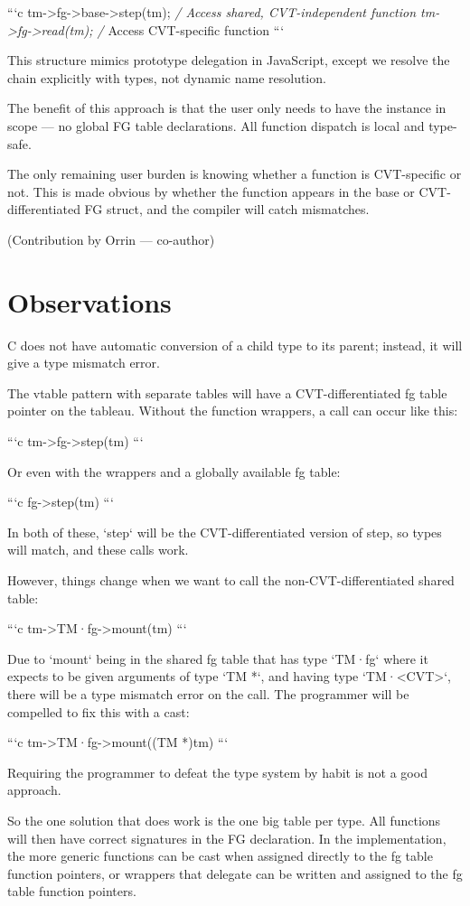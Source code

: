 \documentclass[11pt]{article}
\begin{document}
```c
tm->fg->base->step(tm); \emph{/ Access shared, CVT-independent function
tm->fg->read(tm);       /} Access CVT-specific function
```

This structure mimics prototype delegation in JavaScript, except we resolve the chain explicitly with types, not dynamic name resolution.

The benefit of this approach is that the user only needs to have the instance in scope — no global FG table declarations. All function dispatch is local and type-safe.

The only remaining user burden is knowing whether a function is CVT-specific or not. This is made obvious by whether the function appears in the base or CVT-differentiated FG struct, and the compiler will catch mismatches.

(Contribution by Orrin — co-author)

\section{Observations}
\label{sec:org46e6336}

C does not have automatic conversion of a child type to its parent; instead, it will give a type mismatch error.

The vtable pattern with separate tables will have a CVT-differentiated fg table pointer on the tableau. Without the function wrappers, a call can occur like this:

```c
tm->fg->step(tm)
```

Or even with the wrappers and a globally available fg table:

```c
fg->step(tm)
```

In both of these, `step` will be the CVT-differentiated version of step, so types will match, and these calls work.

However, things change when we want to call the non-CVT-differentiated shared table:

```c
tm->TM·fg->mount(tm)
```

Due to `mount` being in the shared fg table that has type `TM·fg` where it expects to be given arguments of type `TM *`, and having type `TM·<CVT>`, there will be a type mismatch
error on the call. The programmer will be compelled to fix this with a cast:

```c
tm->TM·fg->mount((TM *)tm)
```

Requiring the programmer to defeat the type system by habit is not a good approach.

So the one solution that does work is the one big table per type. All functions will then have correct signatures in the FG declaration. In the implementation, the more generic functions can be cast when assigned directly to the fg table function pointers, or wrappers that delegate can be written and assigned to the fg table function pointers.
\end{document}
